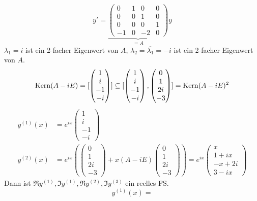 \documentclass[a4paper,twoside,DIV15,BCOR12mm]{scrbook}
\begin{document}
\begin{beispiele}
\item
\[ y'  = 
\underbrace{\begin{pmatrix}
0&1&0&0\\
0&0&1&0\\
0&0&0&1\\
-1&0&-2&0
\end{pmatrix}}_{=A} y \]
$\lambda_1=i$ ist ein 2-facher Eigenwert von $A$, $\lambda_2=\overline{\lambda_1}=-i$ ist ein 2-facher Eigenwert von $A$.
\[\mathop{\rm Kern}\nolimits(A-iE) = [
\begin{pmatrix}
1\\i\\-1\\-i
\end{pmatrix}]\subseteq [
\begin{pmatrix}
1\\i\\-1\\-i
\end{pmatrix}, 
\begin{pmatrix}
0\\1\\2i\\-3
\end{pmatrix}
] = \mathop{\rm Kern}\nolimits(A-i E)^2 \]
\begin{align*}
y^{(1)} (x) &= e^{ix}
\begin{pmatrix}
1\\i\\-1\\-i
\end{pmatrix}\\
y^{(2)}(x) &=  e^{ix}\left(
\begin{pmatrix}
0\\1\\2i\\-3
\end{pmatrix} + x(A-iE)
\begin{pmatrix}
0\\1\\2i\\-3
\end{pmatrix}\right) = e^{ix}
\begin{pmatrix}
x\\1+ix\\-x+2i\\3-ix
\end{pmatrix}
\end{align*}
Dann ist $\Re y^{(1)},\Im y^{(1)},\Re y^{(2)},\Im y^{(3)}$ ein reelles FS.
\[ y^{(1)}(x) =
\]
\end{beispiele}
\end{document}
